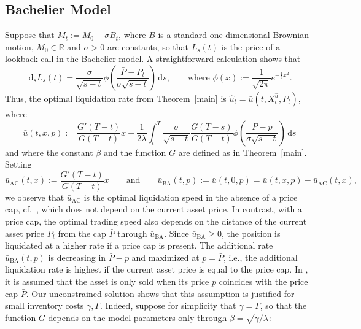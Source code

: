 \documentclass[11pt]{article}
\numberwithin{equation}{section}
\theoremstyle{definition}
\theoremstyle{remark}
\newcommand{\ts}{\textstyle}
\newcommand{\de}{\,\mathrm{d}}
\begin{document}
\subsection{Bachelier Model}
Suppose that $M_t:=M_0 + \sigma B_t$, where $B$ is a standard one-dimensional Brownian motion, $M_0\in\mathbb R$ and $ \sigma>0$ are constants, so that $L_s(t)$ is the price of a lookback call in the Bachelier model. A straightforward calculation shows that
\[
\de_s L_s(t) = \frac{\sigma}{\sqrt{s-t}}\phi\left(\frac{\bar{P}-P_t}{\sigma\sqrt{s-t}}\right)\de s,\qquad\text{where } \phi(x):=\frac{1}{\sqrt{2\pi}}e^{-\frac{1}{2}x^2}.
\]
Thus, the optimal liquidation rate from Theorem~\ref{main} is $\hat{u}_t = \bar{u}(t,X^{\hat{u}}_t,P_t)$, where
\begin{equation}\label{eqn:RateBachelier}
\bar{u}(t,x,p) := \frac{G'(T-t)}{G(T-t)} x +\frac{1}{2\lambda} \int_t^T \frac{\sigma}{\sqrt{s-t}} \frac{G(T-s)}{G(T-t)} \phi\left(\frac{\bar{P}-p}{\sigma\sqrt{s-t}}\right) \de s 
\end{equation}
and where the constant $\beta$ and the function $G$ are defined as in Theorem~\ref{main}. Setting
\[
 \bar{u}_{\mathrm{AC}}(t,x) := \frac{G'(T-t)}{G(T-t)} x\qquad\text{and}\qquad \bar{u}_{\mathrm{BA}}(t,p) := \bar{u}(t,0,p) = \bar{u}(t,x,p) -  \bar{u}_{\mathrm{AC}}(t,x),
\]
we observe that $\bar{u}_{\mathrm{AC}}$ is the optimal liquidation speed in the absence of a price cap, cf.~\cite{almgren2001optimal}, which does not depend on the current asset price. In contrast, with a price cap, the optimal trading speed also depends on the distance of the current asset price $P_t$ from the cap $\bar{P}$ through $\bar{u}_{\mathrm{BA}}$. Since $\bar{u}_{\mathrm{BA}}\ge 0$, the position is liquidated at a higher rate if a price cap is present.  The additional rate $\bar{u}_{\mathrm{BA}}(t,p)$ is decreasing in $\bar P-p$ and maximized at $p = \bar P$, i.e., the additional liquidation rate is highest if the current asset price is equal to the price cap. In \cite{neuman.schied.16}, it is assumed that the asset is only sold when its price $p$ coincides with the price cap $\bar P$. Our unconstrained solution shows that this assumption is justified for small inventory costs $\gamma,\Gamma$. Indeed, suppose for simplicity that $\gamma = \Gamma$, so that the function $G$ depends on the model parameters only through $\beta = \sqrt{\gamma/\lambda}$:
\end{document}
